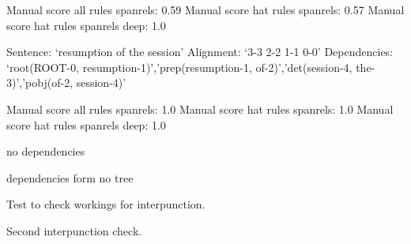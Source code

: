 \documentclass[letterpaper,10pt,english]{sphinxmanual}
\begin{document}
\begin{fulllineitems}
\begin{fulllineitems}
Manual score all rules spanrels: 0.59
Manual score hat rules spanrels: 0.57
Manual score hat rules spanrels deep: 1.0

\end{fulllineitems}


\begin{fulllineitems}
\label{tests:tests_scoring.ScoreTests.score_test4}
Sentence: `resumption of the session'
Alignment: `3-3 2-2 1-1 0-0'
Dependencies: `root(ROOT-0, resumption-1)','prep(resumption-1, of-2)','det(session-4, the-3)','pobj(of-2, session-4)'

Manual score all rules spanrels: 1.0
Manual score hat rules spanrels: 1.0
Manual score hat rules spanrels deep: 1.0

\end{fulllineitems}


\begin{fulllineitems}
\label{tests:tests_scoring.ScoreTests.score_test5}
no dependencies

\end{fulllineitems}


\begin{fulllineitems}
\label{tests:tests_scoring.ScoreTests.score_test6}
dependencies form no tree

\end{fulllineitems}


\begin{fulllineitems}
\label{tests:tests_scoring.ScoreTests.score_test7}
Test to check workings for interpunction.

\end{fulllineitems}


\begin{fulllineitems}
\label{tests:tests_scoring.ScoreTests.score_test8}
Second interpunction check.


\end{fulllineitems}
\end{fulllineitems}
\end{document}
